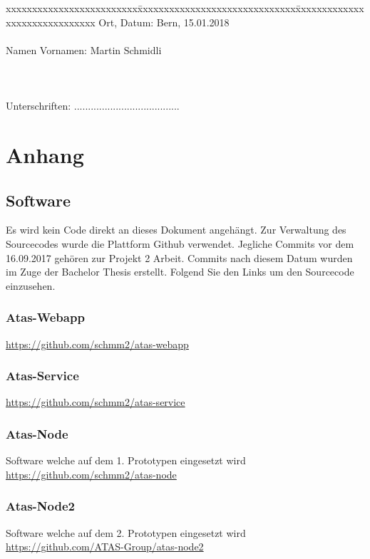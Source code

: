 \documentclass[11pt,english,german]{report}
\theoremstyle{definition}
\begin{document}
\begin{tabbing}
xxxxxxxxxxxxxxxxxxxxxxxxx\=xxxxxxxxxxxxxxxxxxxxxxxxxxxxxx\=xxxxxxxxxxxxxxxxxxxxxxxxxxxxxx\kill
Ort, Datum:\> Bern, 15.01.2018 \\ \\
Namen Vornamen:\> Martin Schmidli  \\ \\ \\ \\ 
Unterschriften:\> ...................................... \\
\end{tabbing}

\chapter*{Anhang}
\section{Software}
Es wird kein Code direkt an dieses Dokument angehängt. Zur Verwaltung des Sourcecodes wurde die Plattform Github verwendet. Jegliche Commits vor dem 16.09.2017 gehören zur Projekt 2 Arbeit. Commits nach diesem Datum wurden im Zuge der Bachelor Thesis erstellt. 
Folgend Sie den Links um den Sourcecode einzusehen.
\subsection{Atas-Webapp}
\url{https://github.com/schmm2/atas-webapp}
\subsection{Atas-Service}
\url{https://github.com/schmm2/atas-service}
\subsection{Atas-Node}
Software welche auf dem 1. Prototypen eingesetzt wird\\
\url{https://github.com/schmm2/atas-node}
\subsection{Atas-Node2}
Software welche auf dem 2. Prototypen eingesetzt wird\\
\url{https://github.com/ATAS-Group/atas-node2}



\printglossaries

\listoffigures
\end{document}
